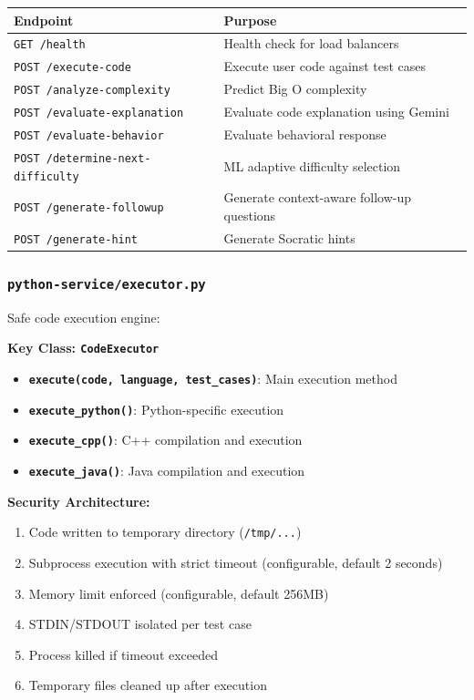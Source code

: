 \documentclass[12pt,a4paper,oneside]{article}
\newcommand{\fileref}[1]{\texttt{#1}}
\newcommand{\funcname}[1]{\texttt{\textbf{#1}}}
\newcommand{\classname}[1]{\texttt{\textbf{#1}}}
\begin{document}
\begin{table}[H]
\centering
\begin{tabular}{|p{2.5cm}|p{11cm}|}
\hline
\textbf{Endpoint} & \textbf{Purpose} \\
\hline
\texttt{GET /health} & Health check for load balancers \\
\hline
\texttt{POST /execute-code} & Execute user code against test cases \\
\hline
\texttt{POST /analyze-complexity} & Predict Big O complexity \\
\hline
\texttt{POST /evaluate-explanation} & Evaluate code explanation using Gemini \\
\hline
\texttt{POST /evaluate-behavior} & Evaluate behavioral response \\
\hline
\texttt{POST /determine-next-difficulty} & ML adaptive difficulty selection \\
\hline
\texttt{POST /generate-followup} & Generate context-aware follow-up questions \\
\hline
\texttt{POST /generate-hint} & Generate Socratic hints \\
\hline
\end{tabular}
\end{table}

\subsubsection{\fileref{python-service/executor.py}}

Safe code execution engine:

\textbf{Key Class: \classname{CodeExecutor}}

\begin{itemize}
    \item \funcname{execute(code, language, test\_cases)}: Main execution method
    \item \funcname{execute\_python()}: Python-specific execution
    \item \funcname{execute\_cpp()}: C++ compilation and execution
    \item \funcname{execute\_java()}: Java compilation and execution
\end{itemize}

\textbf{Security Architecture:}

\begin{enumerate}
    \item Code written to temporary directory (\fileref{/tmp/...})
    \item Subprocess execution with strict timeout (configurable, default 2 seconds)
    \item Memory limit enforced (configurable, default 256MB)
    \item STDIN/STDOUT isolated per test case
    \item Process killed if timeout exceeded
    \item Temporary files cleaned up after execution
\end{enumerate}
\end{document}
